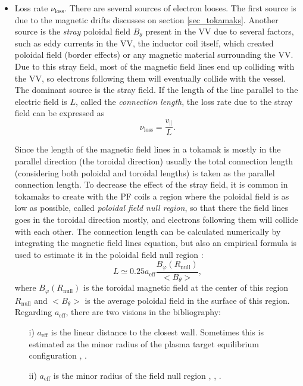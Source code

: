 \documentclass[a4paper,12pt,oneside]{book}
\begin{document}
\begin{itemize}
	\item Loss rate $\nu_\text{loss}$. There are several sources of electron looses. The first source is due to the magnetic drifts discusses on section \ref{sec_tokamaks}. Another source is the \textit{stray} poloidal field $B_\theta$ present in the VV due to several factors, such as eddy currents in the VV, the inductor coil itself, which created poloidal field (border effects) or any magnetic material surrounding the VV. Due to this stray field, most of the magnetic field lines end up colliding with the VV, so electrons following them will eventually collide with the vessel. The dominant source is the stray field. If the length of the line parallel to the electric field is $L$, called the \textit{connection length}, the loss rate due to the stray field can be expressed as
%
	\begin{equation}\label{nu loss}
\nu_\text{loss} = \dfrac{v_{\parallel}}{L}.
	\end{equation}

Since the length of the magnetic field lines in a tokamak is mostly in the parallel direction (the toroidal direction) usually the total connection length (considering both poloidal and toroidal lengths) is taken as the parallel connection length. To decrease the effect of the stray field, it is common in tokamaks to create with the PF coils a region where the poloidal field is as low as possible, called \textit{poloidal field null region}, so that there the field lines goes in the toroidal direction mostly, and electrons following them will collide with each other. The connection length can be calculated numerically by integrating the magnetic field lines equation, but also an empirical formula is used to estimate it in the poloidal field null region \cite{ITER_2007}:
%
	\begin{equation}\label{ec L}
L \simeq 0.25 a_\text{eff}\dfrac{B_\varphi(R_{\text{null}})}{<B_\theta>},
	\end{equation}
where $B_\varphi(R_{\text{null}})$ is the toroidal magnetic field at the center of this region $R_{\text{null}}$ and $<B_\theta>$ is the average poloidal field in the surface of this region. Regarding $a_\text{eff}$, there are two visions in the bibliography:
%
	\begin{itemize}
		\item[i)] $a_\text{eff}$ is the linear distance to the closest wall. Sometimes this is estimated as the minor radius of the plasma target equilibrium configuration \cite{KimThesis}, \cite{Lloyd_1991}.
		\item[ii)] $a_\text{eff}$ is the minor radius of the field null region \cite{TCV_thesis}, \cite{ITER_2007}, \cite{ITER_2019}.
	\end{itemize}

\end{itemize}
\end{document}
